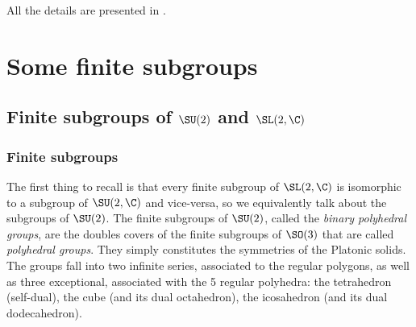\documentclass{worksheetclass}
\begin{document}
    All the details are presented in \cite{albertssonthesis}.

\appendix

\section{Some finite subgroups}

    \subsection{Finite subgroups of $\SU(2)$ and $\SL(2,\C)$}\label{app:su2subgroups}

        \subsubsection{Finite subgroups}

            The first thing to recall is that every finite subgroup of $\SL(2,\C)$ is isomorphic to a subgroup of $\SU(2,\C)$ and vice-versa, so we equivalently talk about the subgroups of $\SU(2)$. The finite subgroups of $\SU(2)$, called the \emph{binary polyhedral groups}, are the doubles covers of the finite subgroups of $\SO(3)$ that are called \emph{polyhedral groups}. They simply constitutes the symmetries of the Platonic solids. The groups fall into two infinite series, associated to the regular polygons, as well as three exceptional, associated with the 5 regular polyhedra: the tetrahedron (self-dual), the cube (and its dual octahedron), the icosahedron (and its dual dodecahedron).
\end{document}
